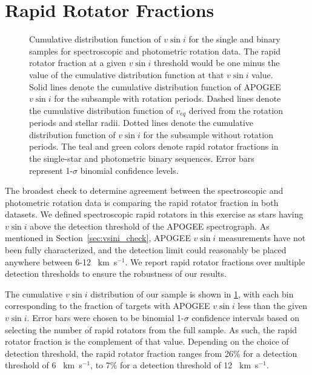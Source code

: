 \documentclass[manuscript]{aastex6}
\newcommand{\vsini}{\ensuremath{v \sin i}}
\newcommand{\kms}{\textrm{~km~s}\ensuremath{^{-1}}}
\begin{document}
\section{Rapid Rotator Fractions}
\label{sec:fraction}

\begin{figure}[htb]
    \caption{Cumulative distribution function of \vsini{} for the single and
        binary samples for spectroscopic and photometric rotation data. The 
        rapid rotator fraction at a given \vsini{} threshold
    would be one minus the value of the cumulative distribution function
    at that \vsini{} value. Solid lines denote the cumulative
    distribution function of APOGEE \vsini{} for the subsample with rotation
    periods. Dashed lines denote  
    the cumulative distribution function of \(v_{eq}\) derived from the
    rotation periods and stellar radii. Dotted lines denote the
    cumulative distribution function of \vsini{} for the subsample without
    rotation periods. The teal and green colors denote rapid rotator fractions
in the single-star and photometric binary sequences. Error bars represent 
    1-\(\sigma\) binomial confidence levels.\label{fig:detection_fraction}}
\end{figure}

The broadest check to determine agreement between the spectroscopic
and photometric rotation data is comparing the rapid rotator fraction
in both datasets. We defined spectroscopic rapid rotators in this exercise as 
stars having \vsini{} above the detection threshold of the APOGEE 
spectrograph. As mentioned in 
Section~\ref{sec:vsini_check}, APOGEE \vsini{} measurements have not been fully
characterized, and the detection limit could reasonably be placed anywhere 
between 6-12 \kms{}. We report rapid rotator fractions over multiple detection 
thresholds to ensure the robustness of our results.

The cumulative \vsini{} distribution of our sample is shown in
\cref{fig:detection_fraction}, with each bin corresponding to the
fraction of targets with APOGEE \vsini{} less than the given
\vsini{}. Error bars were chosen to be binomial 1-\(\sigma\) confidence 
intervals based on selecting the number of rapid rotators from the full 
sample.  As such, the rapid rotator fraction is the complement of that
value. Depending on the choice of detection threshold, the rapid rotator 
fraction ranges from 26\% for a detection threshold of 6 \kms, to 7\%
for a detection threshold of 12 \kms.
\end{document}
